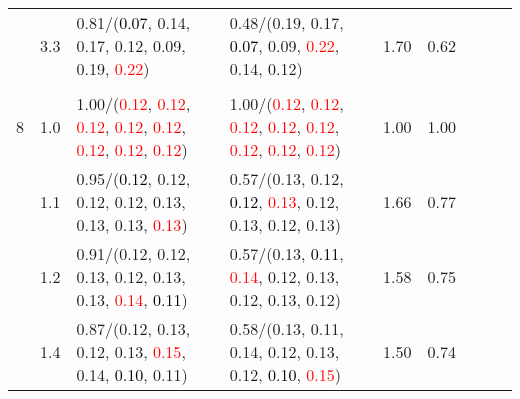 \documentclass[10pt,a4paper]{report}
\begin{document}
\begin{table}[!htbp]
\begin{center}
{\begin{tabular}{ccllccccc}
				  & 3.3                               & 0.81/(\textcolor{black}{0.07}, 0.14, 0.17, 0.12, 0.09, 0.19, \textcolor{red}{0.22})                                                                                                           & 0.48/(0.19, 0.17, \textcolor{black}{0.07}, 0.09, \textcolor{red}{0.22}, 0.14, 0.12)                                                                                                           & 1.70             & 0.62                     \\
				  &                                   &                                                                                                                                                                                               &                                                                                                                                                                                               &                                             \\
				8 & 1.0                               & 1.00/(\textcolor{red}{0.12}, \textcolor{red}{0.12}, \textcolor{red}{0.12}, \textcolor{red}{0.12}, \textcolor{red}{0.12}, \textcolor{red}{0.12}, \textcolor{red}{0.12}, \textcolor{red}{0.12}) & 1.00/(\textcolor{red}{0.12}, \textcolor{red}{0.12}, \textcolor{red}{0.12}, \textcolor{red}{0.12}, \textcolor{red}{0.12}, \textcolor{red}{0.12}, \textcolor{red}{0.12}, \textcolor{red}{0.12}) & 1.00             & 1.00                     \\
				  & 1.1                               & 0.95/(\textcolor{black}{0.12}, 0.12, 0.12, 0.12, 0.13, 0.13, 0.13, \textcolor{red}{0.13})                                                                                                     & 0.57/(0.13, 0.12, \textcolor{black}{0.12}, \textcolor{red}{0.13}, 0.12, 0.13, 0.12, 0.13)                                                                                                     & 1.66             & 0.77                     \\
				  & 1.2                               & 0.91/(0.12, 0.12, 0.13, 0.12, 0.13, 0.13, \textcolor{red}{0.14}, \textcolor{black}{0.11})                                                                                                     & 0.57/(0.13, \textcolor{black}{0.11}, \textcolor{red}{0.14}, 0.12, 0.13, 0.12, 0.13, 0.12)                                                                                                     & 1.58             & 0.75                     \\
				  & 1.4                               & 0.87/(0.12, 0.13, 0.12, 0.13, \textcolor{red}{0.15}, 0.14, \textcolor{black}{0.10}, 0.11)                                                                                                     & 0.58/(0.13, 0.11, 0.14, 0.12, 0.13, 0.12, \textcolor{black}{0.10}, \textcolor{red}{0.15})                                                                                                     & 1.50             & 0.74                     \\

\end{tabular}}
\end{center}
\end{table}
\end{document}
